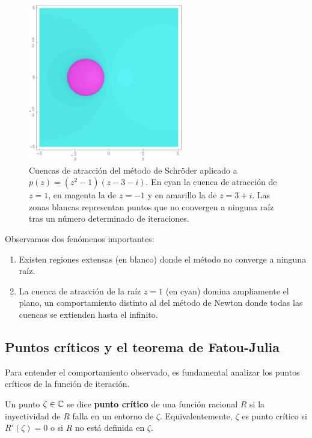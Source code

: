 \begin{figure}[H]
\centering 
\includegraphics[width=0.6\textwidth]{fuentes/articulo-cuadraticos/imagenes/sch_m_2n_1.jpg}
\caption{Cuencas de atracción del método de Schröder aplicado a $p(z)=(z^2-1)(z-3-i)$. En cyan la cuenca de atracción de $z=1$, en magenta la de $z=-1$ y en amarillo la de $z=3+i$. Las zonas blancas representan puntos que no convergen a ninguna raíz tras un número determinado de iteraciones.}
\label{fig:cuenca_cubica_1}
\end{figure}

Observamos dos fenómenos importantes:
\begin{enumerate}
\item Existen regiones extensas (en blanco) donde el método no converge a ninguna raíz.
\item La cuenca de atracción de la raíz $z=1$ (en cyan) domina ampliamente el plano, un comportamiento distinto al del método de Newton donde todas las cuencas se extienden hasta el infinito.
\end{enumerate}

\subsection{Puntos críticos y el teorema de Fatou-Julia}

Para entender el comportamiento observado, es fundamental analizar los puntos críticos de la función de iteración.

Un punto $\zeta\in\mathbb{C}$ se dice \textbf{punto crítico} de una función racional $R$ si la inyectividad de $R$ falla en un entorno de $\zeta$. Equivalentemente, $\zeta$ es punto crítico si $R'(\zeta)=0$ o si $R$ no está definida en $\zeta$.


